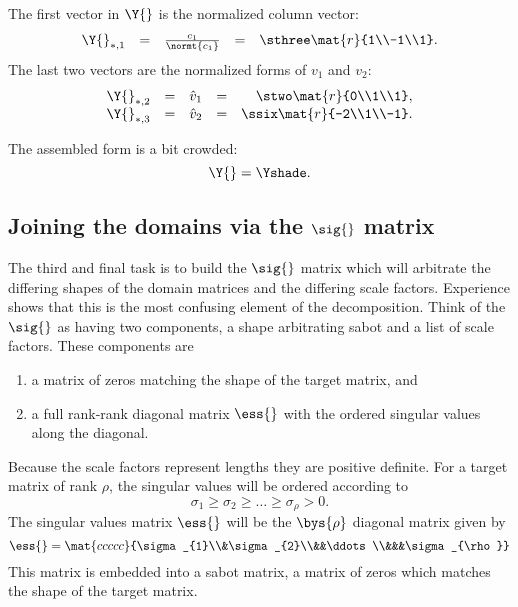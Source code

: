 The first vector in $\Y{}$ is the normalized column vector:
\begin{equation}
  \begin{array}{lcccr}
    \Y{}_{*,1} &=& \frac{c_{1}}{\normt{c_{1}}} &=& \sthree\mat{r}{1\\-1\\1}.
  \end{array}
\end{equation}
The last two vectors are the normalized forms of $v_{1}$ and $v_{2}$:
\begin{equation}
  \begin{array}{lcccr}
    \Y{}_{*,2} &=& \hat{v}_{1} &=& \stwo\mat{r}{0\\1\\1},\\
    \Y{}_{*,3} &=& \hat{v}_{2} &=& \ssix\mat{r}{-2\\1\\-1}.
  \end{array}
\end{equation}

The assembled form is a bit crowded:
\begin{equation}
  \Y{}=\Yshade.
\end{equation}

\subsection{Joining the domains via the $\sig{}$ matrix}
\label{scale}
The third and final task is to build the $\sig{}$ matrix which will arbitrate the differing shapes of the domain matrices and the differing scale factors. Experience shows that this is the most confusing element of the decomposition. Think of the $\sig{}$ as having two components, a shape arbitrating sabot and a list of scale factors. These components are
\begin{enumerate}
\item a matrix of zeros matching the shape of the target matrix, and
\item a full rank-rank diagonal matrix $\ess{}$ with the ordered singular values along the diagonal.
\end{enumerate}
Because the scale factors represent lengths they are positive definite. For a target matrix of rank $\rho$, the singular values will be ordered according to
\begin{equation}
  \sigma_{1}\ge\sigma_{2}\ge\dots\ge\sigma_{\rho}>0.
\end{equation}
The singular values matrix $\ess{}$ will be the $\bys{\rho}$ diagonal matrix given by
\begin{equation}
  \ess{}=\mat{ccccc}{\sigma_{1}\\&\sigma_{2}\\&&\ddots\\&&&\sigma_{\rho}}
\end{equation}
This matrix is embedded into a sabot matrix, a matrix of zeros which matches the shape of the target matrix. 

